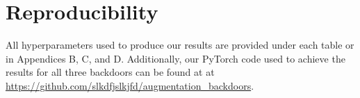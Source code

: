 \section{Reproducibility}

All hyperparameters used to produce our results are provided under each table or in Appendices B, C, and D. Additionally, our PyTorch code used to achieve the results for all three backdoors can be found at at \href{https://github.com/slkdfjslkjfd/augmentation\_backdoors}{https://github.com/slkdfjslkjfd/augmentation\_backdoors}.